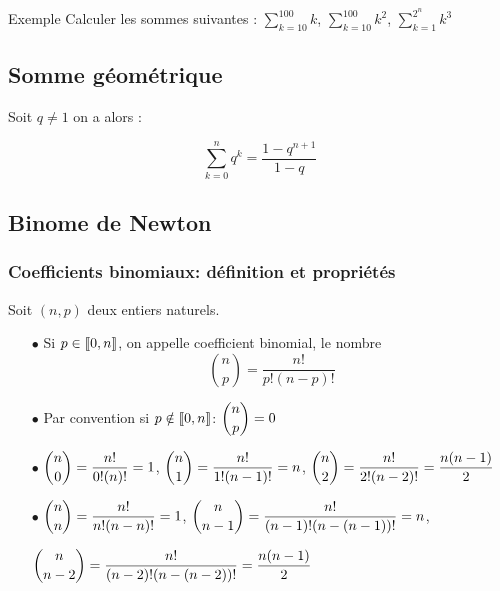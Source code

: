 \documentclass[a4paper, 11pt,reqno]{article}
\begin{document}
Exemple 
Calculer les sommes suivantes : 
$\sum_{k=10}^{100} k$, $\sum_{k=10}^{100} k^2$,  $\sum_{k=1}^{2^n} k^3$


\subsection{Somme géométrique}
\begin{prop}
Soit $q\neq 1$ on a alors : 

$$\sum_{k=0}^n q^k =\frac{1-q^{n+1}}{1-q}$$
\end{prop}


\subsection{Binome de Newton}



\subsubsection{Coefficients binomiaux: d\'efinition et propri\'et\'es}






\begin{defi} Soit $(n,p)$ deux entiers naturels.
\begin{itemize}
\item[$\bullet$] Si $p\in \llbracket 0,n\rrbracket$, on appelle coefficient binomial, le nombre
$$\binom{n}{p}=\frac{n! }{p! (n-p)!}$$
\item[$\bullet$] Par convention si $p\notin \llbracket 0,n\rrbracket$: $\displaystyle\binom{n}{p}=0$
\end{itemize}
\end{defi}

\vspace{0.3cm}

\begin{exemples}
\begin{itemize}
\item[$\bullet$] $\displaystyle\binom{n}{0}=\frac{n! }{0! (n)!}=1$, $\displaystyle\binom{n}{1}=\frac{n! }{1! (n-1)!}=n$, $\displaystyle\binom{n}{2}=\frac{n! }{2! (n-2)!}=\frac{n(n-1)}{2}$\\
\vspace{1cm}
\item[$\bullet$] $\displaystyle\binom{n}{n}=\frac{n! }{n! (n-n)!}=1$, \quad\quad\quad $\displaystyle\binom{n}{n-1}=\frac{n! }{(n-1)! (n-(n-1))!}=n$, \\
\item []
\vspace{1cm}
$\displaystyle\binom{n}{n-2}=\frac{n! }{(n-2)! (n-(n-2))!}=\frac{n(n-1)}{2} $
\end{itemize}
\end{exemples}
\vspace{0.4cm}
\end{document}
